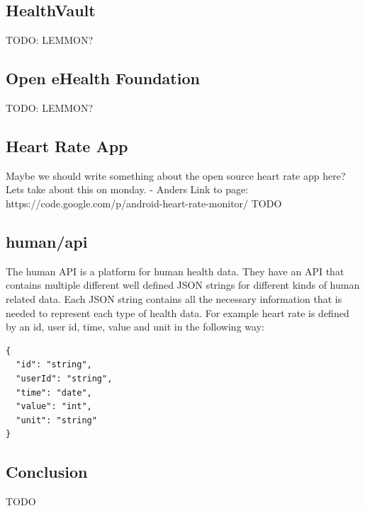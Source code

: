 \subsection{HealthVault}

TODO: LEMMON?

\subsection{Open eHealth Foundation}

TODO: LEMMON?

\subsection{Heart Rate App}

Maybe we should write something about the open source heart rate app here?
Lets take about this on monday. - Anders
Link to page: https://code.google.com/p/android-heart-rate-monitor/
TODO

\subsection{human/api}

The human API is a platform for human health data. 
They have an API that contains multiple different well defined JSON strings for different kinds of human related data.
Each JSON string contains all the necessary information that is needed to represent each type of health data.
For example heart rate is defined by an id, user id, time, value and unit in the following way:

\begin{verbatim}
{
  "id": "string",
  "userId": "string",
  "time": "date",
  "value": "int",
  "unit": "string"
}
\end{verbatim}

\subsection{Conclusion}

TODO

